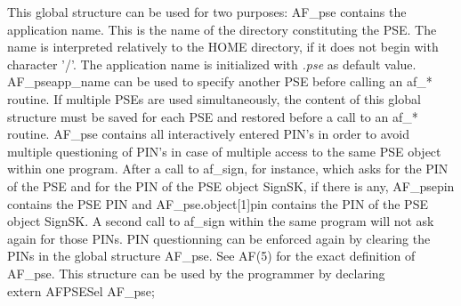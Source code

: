 This global structure can be used for two purposes:
\be
\m AF\_pse contains the application name. This is the
   name of the directory constituting the PSE. The name is interpreted 
   relatively to the HOME directory, if it does not begin with character '/'.
   The application name is initialized with {\em .pse} as default value.
   AF\_pse\pf app\_name can be used to specify another PSE before calling
   an af\_* routine. If multiple PSEs are used simultaneously, the content
   of this global structure must be saved for each PSE and restored
   before a call to an af\_* routine.
\m AF\_pse contains all interactively entered PIN's in order to avoid multiple
   questioning of PIN's in case of multiple access to the same PSE object within
   one program. After a call to af\_sign, for instance, which asks for the PIN
   of the PSE and for the PIN of the PSE object SignSK, if there is any,
   AF\_pse\pf pin contains the PSE PIN and AF\_pse.object[1]\pf pin contains the
   PIN of the PSE object SignSK. A second call to af\_sign within the same
   program will not ask again for those PINs. PIN questionning can be
   enforced again by clearing the PINs in the global structure AF\_pse.
   See AF(5) for the exact definition of AF\_pse.
\ee
This structure can be used by the programmer by declaring \\

{\small
extern AFPSESel AF\_pse;
}
